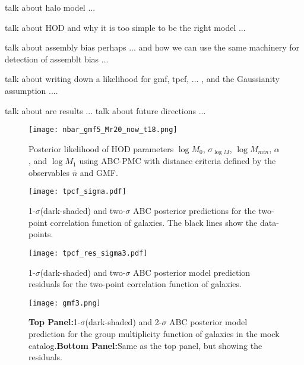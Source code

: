 \documentclass[12pt, preprint]{aastex}
\begin{document}
talk about halo model ...

talk about HOD and why it is too simple to be the right model ...

talk about assembly bias perhaps ... and how we can use the same machinery for detection of assemblt bias ... 

talk about writing down a likelihood for gmf, tpcf, ... , and the Gaussianity assumption ....

talk about are results ...
talk about future directions ...

\begin{figure*}
\begin{center}
\texttt{[image: nbar\_gmf5\_Mr20\_now\_t18.png]}
\caption{Posterior likelihood of HOD parameters $\log M_0$, 
$\sigma_{\log M}$, $\log M_{min}$, $\alpha$, and $\log M_1$ using ABC-PMC 
with distance criteria defined by the observables $\bar{n}$ and GMF.}
\label{fig:post_abc_nbargmf}
\end{center}
\end{figure*}
\begin{figure*}
\begin{center}
  \texttt{[image: tpcf\_sigma.pdf]}
\caption{1-$\sigma$(dark-shaded) and two-$\sigma$ ABC posterior predictions
for the two-point correlation function of galaxies. The black lines show the data-points.}
\label{fig:gmf_cov}
\end{center}
\end{figure*}


\begin{figure*}
\begin{center}
  \texttt{[image: tpcf\_res\_sigma3.pdf]}
\caption{1-$\sigma$(dark-shaded) and two-$\sigma$ ABC posterior model prediction residuals
for the two-point correlation function of galaxies.}
\label{fig:2pcf-model}
\end{center}
\end{figure*}

\begin{figure*}
\begin{center}
  \texttt{[image: gmf3.png]}
\caption{{\bf Top Panel:}1-$\sigma$(dark-shaded) and 2-$\sigma$ ABC posterior model prediction 
for the group multiplicity function of galaxies in the mock catalog.{\bf Bottom Panel:}Same as the top panel, but showing the residuals.}
\label{fig:2pcf-model}
\end{center}
\end{figure*}
\end{document}
